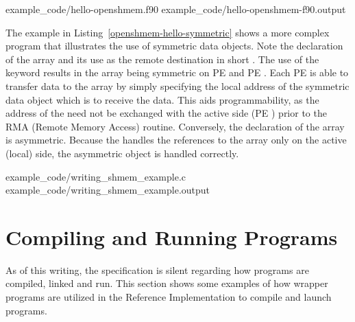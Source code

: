 \begin{minipage}{\linewidth}
\vspace{0.1in}
                {example_code/hello-openshmem.f90}
                {example_code/hello-openshmem-f90.output}
\vspace{0.1in}
\end{minipage}

The example in Listing~\ref{openshmem-hello-symmetric} shows a more complex \openshmem program that illustrates
the use of symmetric data objects.  Note the declaration of the   array and its use as the remote destination in \openshmem short
\PUT.  The use of the  keyword results in the  array being
symmetric on \ac{PE}  and \ac{PE} .  Each \ac{PE} is able to
transfer data to the \dest{} array by simply specifying the local address of the
symmetric data object which is to receive the data.  This aids programmability,
as the address of the \dest{} need not be exchanged with the active side
(\ac{PE} ) prior to the RMA (Remote Memory Access) routine.
Conversely, the declaration of the  array is asymmetric.
Because the \PUT{} handles the references to the  array only on the
active (local) side, the asymmetric \source{} object is handled correctly.

\begin{minipage}{\linewidth}
\vspace{0.1in}
                {example_code/writing_shmem_example.c}
                {example_code/writing_shmem_example.output}
\vspace{0.1in}
\end{minipage}




\chapter{Compiling and Running Programs}\label{sec:compiling}
As of this writing, the \openshmem{} specification is silent regarding how
\openshmem{} programs are compiled, linked and run. This section shows some
examples of how wrapper programs are utilized in the \openshmem{} Reference
Implementation to compile and launch programs.

